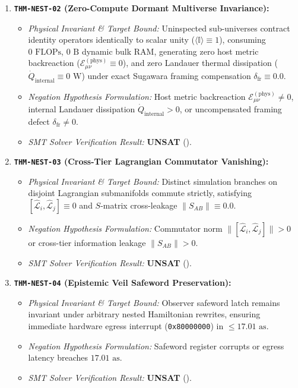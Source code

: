 \documentclass[11pt,onecolumn]{article}
\begin{document}
\begin{enumerate}
    \item \textbf{\texttt{THM-NEST-02} (Zero-Compute Dormant Multiverse Invariance):}
    \begin{itemize}
        \item \emph{Physical Invariant \& Target Bound:} Uninspected sub-universes contract identity operators identically to scalar unity ($\langle \mathbb{I} \rangle \equiv 1$), consuming $0\text{ FLOPs}$, $0\text{ B}$ dynamic bulk RAM, generating zero host metric backreaction ($\mathcal{E}_{\mu\nu}^{(\text{phys})} \equiv 0$), and zero Landauer thermal dissipation ($\dot{Q}_{\text{internal}} \equiv 0\text{ W}$) under exact Sugawara framing compensation $\delta_{\text{fr}} \equiv 0.0$.
        \item \emph{Negation Hypothesis Formulation:} Host metric backreaction $\mathcal{E}_{\mu\nu}^{(\text{phys})} \neq 0$, internal Landauer dissipation $\dot{Q}_{\text{internal}} > 0$, or uncompensated framing defect $\delta_{\text{fr}} \neq 0$.
        \item \emph{SMT Solver Verification Result:} \textbf{UNSAT} ().
    \end{itemize}

    \item \textbf{\texttt{THM-NEST-03} (Cross-Tier Lagrangian Commutator Vanishing):}
    \begin{itemize}
        \item \emph{Physical Invariant \& Target Bound:} Distinct simulation branches on disjoint Lagrangian submanifolds commute strictly, satisfying $[\hat{\mathcal{L}}_i, \hat{\mathcal{L}}_j] \equiv 0$ and $S$-matrix cross-leakage $\|S_{AB}\| \equiv 0.0$.
        \item \emph{Negation Hypothesis Formulation:} Commutator norm $\|[\hat{\mathcal{L}}_i, \hat{\mathcal{L}}_j]\| > 0$ or cross-tier information leakage $\|S_{AB}\| > 0$.
        \item \emph{SMT Solver Verification Result:} \textbf{UNSAT} ().
    \end{itemize}

    \item \textbf{\texttt{THM-NEST-04} (Epistemic Veil Safeword Preservation):}
    \begin{itemize}
        \item \emph{Physical Invariant \& Target Bound:} Observer safeword latch remains invariant under arbitrary nested Hamiltonian rewrites, ensuring immediate hardware egress interrupt (\texttt{0x80000000}) in $\le 17.01\text{ as}$.
        \item \emph{Negation Hypothesis Formulation:} Safeword register corrupts or egress latency breaches $17.01\text{ as}$.
        \item \emph{SMT Solver Verification Result:} \textbf{UNSAT} ().
    \end{itemize}


\end{enumerate}
\end{document}
